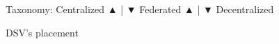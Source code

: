     Taxonomy:
         Centralized
              ▲
              |
              ▼
          Federated
              ▲
              |
              ▼
        Decentralized
    
    DSV's placement
    